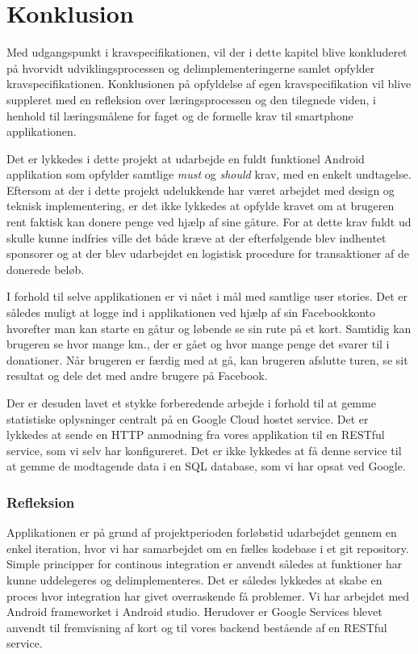 \thispagestyle{fancy}
\chapter{Konklusion}
\label{chp:Konklusion}
Med udgangspunkt i kravspecifikationen, vil der i dette kapitel blive konkluderet på hvorvidt udviklingsprocessen og delimplementeringerne samlet opfylder kravspecifikationen. Konklusionen på opfyldelse af egen kravspecifikation vil blive suppleret med en refleksion over læringsprocessen og den tilegnede viden, i henhold til læringsmålene for faget og de formelle krav til smartphone applikationen.

Det er lykkedes i dette projekt at udarbejde en fuldt funktionel Android applikation som opfylder samtlige \emph{must} og \emph{should} krav, med en enkelt undtagelse. Eftersom at der i dette projekt udelukkende har været arbejdet med design og teknisk implementering, er det ikke lykkedes at opfylde kravet om at brugeren rent faktisk kan donere penge ved hjælp af sine gåture. For at dette krav fuldt ud skulle kunne indfries ville det både kræve at der efterfølgende blev indhentet sponsorer og at der blev udarbejdet en logistisk procedure for transaktioner af de donerede beløb.

I forhold til selve applikationen er vi nået i mål med samtlige user stories. Det er således muligt at logge ind i applikationen ved hjælp af sin Facebookkonto hvorefter man kan starte en gåtur og løbende se sin rute på et kort. Samtidig kan brugeren se hvor mange km., der er gået og hvor mange penge det svarer til i donationer. Når brugeren er færdig med at gå, kan brugeren afslutte turen, se sit resultat og dele det med andre brugere på Facebook. 

Der er desuden lavet et stykke forberedende arbejde i forhold til at gemme statistiske oplysninger centralt på en Google Cloud hostet service. Det er lykkedes at sende en HTTP anmodning fra vores applikation til en RESTful service, som vi selv har konfigureret. Det er ikke lykkedes at få denne service til at gemme de modtagende data i en SQL database, som vi har opsat ved Google.

\subsection{Refleksion}
Applikationen er på grund af projektperioden forløbstid udarbejdet gennem en enkel iteration, hvor vi har samarbejdet om en fælles kodebase i et git repository. Simple principper for continous integration er anvendt således at funktioner har kunne uddelegeres og delimplementeres. Det er således lykkedes at skabe en proces hvor integration har givet overraskende få problemer. Vi har arbejdet med Android frameworket i Android studio. Herudover er Google Services blevet anvendt til fremvisning af kort og til vores backend bestående af en RESTful service.

